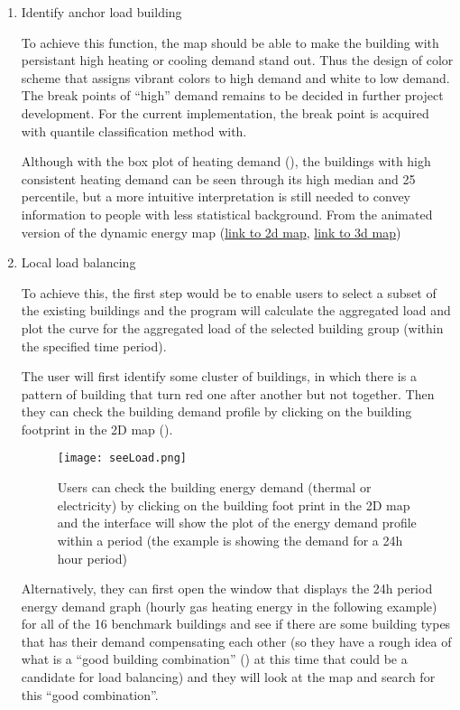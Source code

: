 \begin{enumerate}[1).]
\item Identify anchor load building
  
  To achieve this function, the map should be able to make the
  building with persistant high heating or cooling demand stand
  out. Thus the design of color scheme that assigns vibrant colors to
  high demand and white to low demand. The break points of ``high''
  demand remains to be decided in further project development. For the
  current implementation, the break point is acquired with quantile
  classification method with.
  
  Although with the box plot of heating demand (), the
  buildings with high consistent heating demand can be seen through
  its high median and 25 percentile, but a more intuitive
  interpretation is still needed to convey information to people with
  less statistical background. From the animated version of the
  dynamic energy map
  (\href{http://www.armechxyj.com/energy-mapping.html#redblueAnime2d}{link
    to 2d map},
  \href{http://www.armechxyj.com/energy-mapping.html#redblueAnime3d}{link
    to 3d map})

\item Local load balancing
  
  To achieve this, the first step would be to enable users to select a
  subset of the existing buildings and the program will calculate the
  aggregated load and plot the curve for the aggregated load of the
  selected building group (within the specified time period).
  
  The user will first identify some cluster of buildings, in which
  there is a pattern of building that turn red one after another but
  not together. Then they can check the building demand profile by
  clicking on the building footprint in the 2D map
  ().

  \begin{figure}[h!]
    \centering
    \texttt{[image: seeLoad.png]}
    \caption[Check Energy Demand]{Users can check the building energy
      demand (thermal or electricity) by clicking on the building foot
      print in the 2D map and the interface will show the plot of the
      energy demand profile within a period (the example is showing
      the demand for a 24h hour period)}
    \label{fig:seeLoad}
  \end{figure}
  
  Alternatively, they can first open the window that displays the 24h
  period energy demand graph (hourly gas heating energy in the
  following example) for all of the 16 benchmark buildings and see if
  there are some building types that has their demand compensating
  each other (so they have a rough idea of what is a ``good building
  combination'' () at this time that could be a
  candidate for load balancing) and they will look at the map and
  search for this ``good combination''.


\end{enumerate}
